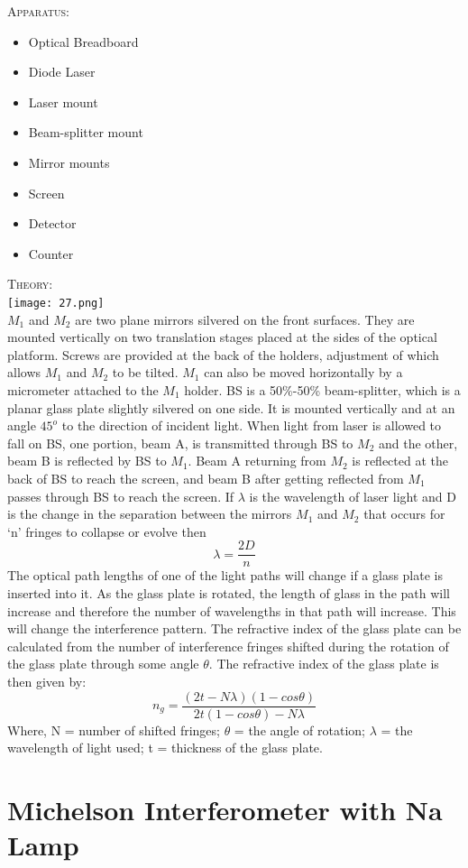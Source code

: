 \documentclass[12pt]{report}
\begin{document}
	\textsc{\large{Apparatus: }}
	\begin{itemize}
		\item Optical Breadboard
		\item Diode Laser
		\item Laser mount
		\item Beam-splitter mount
		\item Mirror mounts
		\item Screen
		\item Detector
		\item Counter
	\end{itemize}
	\textsc{\large{Theory:}}
	\\
	\texttt{[image: 27.png]}\\
	$M_1$ and $M_2$ are two plane mirrors silvered on the front surfaces. They are mounted vertically on two translation stages placed at the sides of the optical platform. Screws are provided at the back of the holders, adjustment of which allows $M_1$ and $M_2$ to be tilted. $M_1$ can also be moved horizontally by a micrometer attached to the $M_1$ holder. BS is a 50\%-50\% beam-splitter, which is a planar glass plate slightly silvered on one side. It is mounted vertically and at an angle $45^o$ to the direction of incident light.
	When light from laser is allowed to fall on BS, one portion, beam A, is transmitted through BS to $M_2$ and the other, beam B is reflected by BS to $M_1$. Beam A returning from $M_2$ is reflected at the back of BS to reach the screen, and beam B after getting reflected from $M_1$ passes through BS to reach the screen.  If $\lambda$ is the wavelength of laser light and D is the change in the separation between the mirrors $M_1$ and $M_2$ that occurs for ‘n’ fringes to collapse or evolve then
	$$\lambda = \frac{2D}{n}$$
	The optical path lengths of one of the light paths will change if a glass plate is inserted into it. As the glass plate is rotated, the length of glass in the path will increase and therefore the number of wavelengths in that path will increase. This will change the interference pattern. The refractive index of the glass plate can be calculated from the number of interference fringes shifted during the rotation of the glass plate through some angle $\theta$. The refractive index of the glass plate is then given by:
	$$n_g = \frac{(2t-N\lambda)(1-cos\theta)}{2t(1-cos\theta)-N\lambda} $$
	Where, N = number of shifted fringes;  $\theta$ = the angle of rotation;  $\lambda$ = the wavelength of light used;  t = thickness of the glass plate.
	\newpage
	\section{Michelson Interferometer with Na Lamp} 
	
\end{document}

